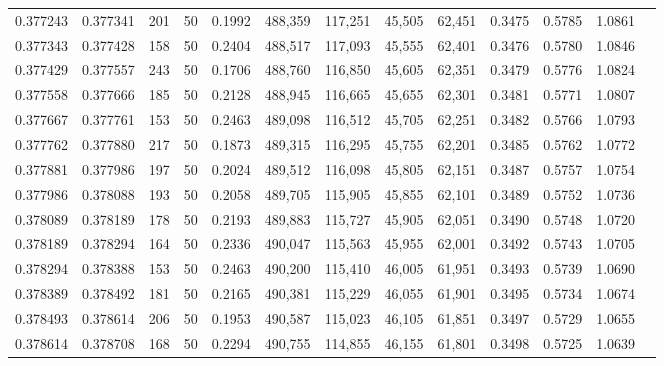 \begin{tabular}{rrrrrrrrrrrrr}
0.377243 & 0.377341 &   201 &  50 &                                     0.1992 & 488,359 & 117,251 &  45,505 &  62,451 & 0.3475 & 0.5785 & 1.0861 \\
0.377343 & 0.377428 &   158 &  50 &                                     0.2404 & 488,517 & 117,093 &  45,555 &  62,401 & 0.3476 & 0.5780 & 1.0846 \\
0.377429 & 0.377557 &   243 &  50 &                                     0.1706 & 488,760 & 116,850 &  45,605 &  62,351 & 0.3479 & 0.5776 & 1.0824 \\
0.377558 & 0.377666 &   185 &  50 &                                     0.2128 & 488,945 & 116,665 &  45,655 &  62,301 & 0.3481 & 0.5771 & 1.0807 \\
0.377667 & 0.377761 &   153 &  50 &                                     0.2463 & 489,098 & 116,512 &  45,705 &  62,251 & 0.3482 & 0.5766 & 1.0793 \\
0.377762 & 0.377880 &   217 &  50 &                                     0.1873 & 489,315 & 116,295 &  45,755 &  62,201 & 0.3485 & 0.5762 & 1.0772 \\
0.377881 & 0.377986 &   197 &  50 &                                     0.2024 & 489,512 & 116,098 &  45,805 &  62,151 & 0.3487 & 0.5757 & 1.0754 \\
0.377986 & 0.378088 &   193 &  50 &                                     0.2058 & 489,705 & 115,905 &  45,855 &  62,101 & 0.3489 & 0.5752 & 1.0736 \\
0.378089 & 0.378189 &   178 &  50 &                                     0.2193 & 489,883 & 115,727 &  45,905 &  62,051 & 0.3490 & 0.5748 & 1.0720 \\
0.378189 & 0.378294 &   164 &  50 &                                     0.2336 & 490,047 & 115,563 &  45,955 &  62,001 & 0.3492 & 0.5743 & 1.0705 \\
0.378294 & 0.378388 &   153 &  50 &                                     0.2463 & 490,200 & 115,410 &  46,005 &  61,951 & 0.3493 & 0.5739 & 1.0690 \\
0.378389 & 0.378492 &   181 &  50 &                                     0.2165 & 490,381 & 115,229 &  46,055 &  61,901 & 0.3495 & 0.5734 & 1.0674 \\
0.378493 & 0.378614 &   206 &  50 &                                     0.1953 & 490,587 & 115,023 &  46,105 &  61,851 & 0.3497 & 0.5729 & 1.0655 \\
0.378614 & 0.378708 &   168 &  50 &                                     0.2294 & 490,755 & 114,855 &  46,155 &  61,801 & 0.3498 & 0.5725 & 1.0639 \\

\end{tabular}
